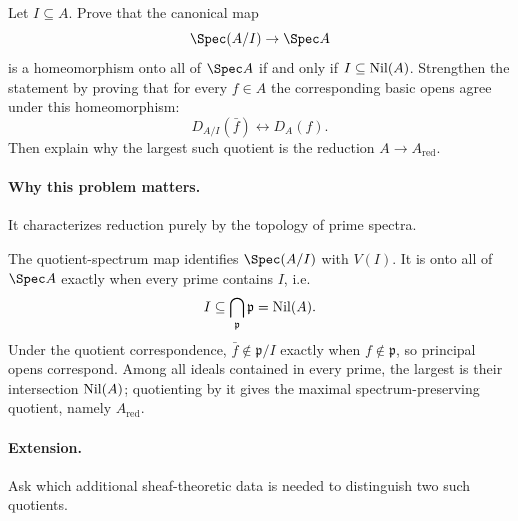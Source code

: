 \begin{problem}
Let $I\subseteq A$.  Prove that the canonical map
\[
\Spec(A/I)\to\Spec A
\]
is a homeomorphism onto all of $\Spec A$ if and only if $I\subseteq\operatorname{Nil}(A)$.  Strengthen
the statement by proving that for every $f\in A$ the corresponding basic opens agree under
this homeomorphism:
\[
D_{A/I}(\bar f)\longleftrightarrow D_A(f).
\]
Then explain why the largest such quotient is the reduction $A\to A_{\mathrm{red}}$.
\end{problem}
\paragraph{Why this problem matters.}
It characterizes reduction purely by the topology of prime spectra.
\begin{solution}
The quotient-spectrum map identifies $\Spec(A/I)$ with $V(I)$.  It is onto all of
$\Spec A$ exactly when every prime contains $I$, i.e.
\[
I\subseteq\bigcap_{\mathfrak p}\mathfrak p=\operatorname{Nil}(A).
\]
Under the quotient correspondence, $\bar f\notin\mathfrak p/I$ exactly when
$f\notin\mathfrak p$, so principal opens correspond.  Among all ideals contained in every
prime, the largest is their intersection $\operatorname{Nil}(A)$; quotienting by it gives the maximal
spectrum-preserving quotient, namely $A_{\mathrm{red}}$.
\end{solution}
\paragraph{Extension.}
Ask which additional sheaf-theoretic data is needed to distinguish two such quotients.
